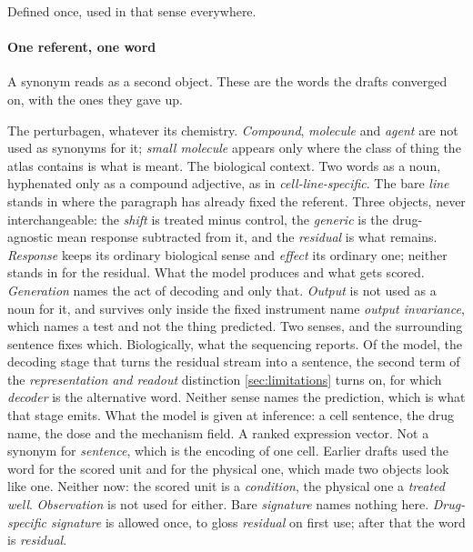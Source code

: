 \noindent
Defined once, used in that sense everywhere.

\paragraph{One referent, one word} A synonym reads as a second object. These
are the words the drafts converged on, with the ones they gave up.

\begin{description}[leftmargin=1em, itemsep=0.5ex,
                    font=\normalfont\bfseries]
 The perturbagen, whatever its chemistry.
  \emph{Compound}, \emph{molecule} and \emph{agent} are not used as synonyms for
  it; \emph{small molecule} appears only where the class of thing the atlas
  contains is what is meant.
 The biological context. Two words as a noun,
  hyphenated only as a compound adjective, as in \emph{cell-line-specific}. The
  bare \emph{line} stands in where the paragraph has already fixed the referent.
 Three objects, never
  interchangeable: the \emph{shift} is treated minus control, the
  \emph{generic} is the drug-agnostic mean response subtracted from it, and the
  \emph{residual} is what remains. \emph{Response} keeps its ordinary
  biological sense and \emph{effect} its ordinary one; neither stands in for
  the residual.
 What the model produces and what gets scored.
  \emph{Generation} names the act of decoding and only that. \emph{Output} is
  not used as a noun for it, and survives only inside the
  fixed instrument name \emph{output invariance}, which names a test and not
  the thing predicted.
 Two senses, and the surrounding sentence fixes which.
  Biologically, what the sequencing reports. Of the model, the decoding stage
  that turns the residual stream into a sentence, the second term of the
  \emph{representation and readout} distinction \cref{sec:limitations} turns on,
  for which \emph{decoder} is the alternative word. Neither sense names the
  prediction, which is what that stage emits.
 What the model is given at inference: a cell sentence,
  the drug name, the dose and the mechanism field.
 A ranked expression vector. Not a synonym for
  \emph{sentence}, which is the encoding of one cell.
 Earlier drafts used the word for the scored
  unit and for the physical one, which made two objects look like one. Neither
  now: the scored unit is a \emph{condition}, the physical one a \emph{treated
  well}. \emph{Observation} is not used for either.
 Bare \emph{signature} names nothing
  here. \emph{Drug-specific signature} is allowed once, to gloss
  \emph{residual} on first use; after that the word is \emph{residual}.
\end{description}

